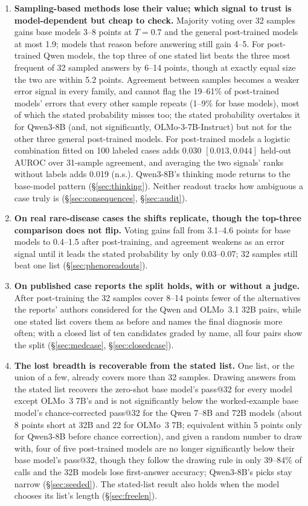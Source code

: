 \documentclass[11pt]{article}
\begin{document}
\begin{enumerate}
\item \textbf{Sampling-based methods lose their value; which signal to trust is model-dependent but cheap to check.} Majority voting over 32 samples gains base models 3--8 points at $T{=}0.7$ and the general post-trained models at most 1.9; models that reason before answering still gain 4--5. For post-trained Qwen models, the top three of one stated list beats the three most frequent of 32 sampled answers by 6--14 points, though at exactly equal size the two are within 5.2 points. Agreement between samples becomes a weaker error signal in every family, and cannot flag the 19--61\% of post-trained models' errors that every other sample repeats (1--9\% for base models), most of which the stated probability misses too; the stated probability overtakes it for Qwen3-8B (and, not significantly, OLMo-3-7B-Instruct) but not for the other three general post-trained models. For post-trained models a logistic combination fitted on 100 labeled cases adds 0.030 $[0.013,0.044]$ held-out AUROC over 31-sample agreement, and averaging the two signals' ranks without labels adds 0.019 (n.s.). Qwen3-8B's thinking mode returns to the base-model pattern (\S\ref{sec:thinking}). Neither readout tracks how ambiguous a case truly is (\S\ref{sec:consequences}, \S\ref{sec:audit}).
\item \textbf{On real rare-disease cases the shifts replicate, though the top-three comparison does not flip.} Voting gains fall from 3.1--4.6 points for base models to 0.4--1.5 after post-training, and agreement weakens as an error signal until it leads the stated probability by only 0.03--0.07; 32 samples still beat one list (\S\ref{sec:phenoreadouts}).
\item \textbf{On published case reports the split holds, with or without a judge.} After post-training the 32 samples cover 8--14 points fewer of the alternatives the reports' authors considered for the Qwen and OLMo~3.1 32B pairs, while one stated list covers them as before and names the final diagnosis more often; with a closed list of ten candidates graded by name, all four pairs show the split (\S\ref{sec:medcase}, \S\ref{sec:closedcase}).
\item \textbf{The lost breadth is recoverable from the stated list.} One list, or the union of a few, already covers more than 32 samples. Drawing answers from the stated list recovers the zero-shot base model's pass@32 for every model except OLMo~3 7B's and is not significantly below the worked-example base model's chance-corrected pass@32 for the Qwen 7--8B and 72B models (about 8 points short at 32B and 22 for OLMo~3 7B; equivalent within 5 points only for Qwen3-8B before chance correction), and given a random number to draw with, four of five post-trained models are no longer significantly below their base model's pass@32, though they follow the drawing rule in only 39--84\% of calls and the 32B models lose first-answer accuracy; Qwen3-8B's picks stay narrow (\S\ref{sec:seeded}). The stated-list result also holds when the model chooses its list's length (\S\ref{sec:freelen}).

\end{enumerate}
\end{document}

